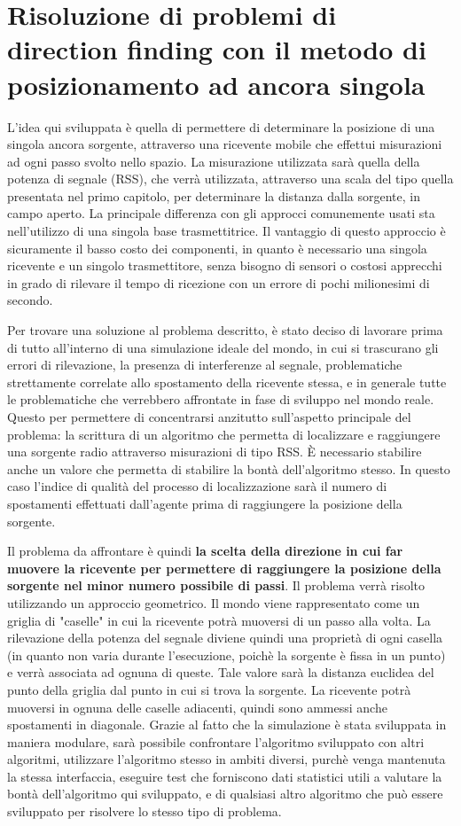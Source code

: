 \section{Risoluzione di problemi di direction finding con il metodo di posizionamento ad ancora singola}
L'idea  qui sviluppata è quella di permettere di determinare la posizione di una singola ancora sorgente, attraverso una ricevente mobile che effettui misurazioni ad ogni passo svolto nello spazio. La misurazione utilizzata sarà quella della potenza di segnale (RSS), che verrà utilizzata, attraverso una scala del tipo quella presentata nel primo capitolo, per determinare la distanza dalla sorgente, in campo aperto.
La principale differenza con gli approcci comunemente usati sta nell'utilizzo di una singola base trasmettitrice. 
Il vantaggio di questo approccio è sicuramente il basso costo dei componenti, in quanto è necessario una singola ricevente e un singolo trasmettitore, senza bisogno di sensori o costosi apprecchi in grado di rilevare il tempo di ricezione con un errore di pochi milionesimi di secondo.

Per trovare una soluzione al problema descritto, è stato deciso di lavorare prima di tutto all'interno di una simulazione ideale del mondo, in cui si trascurano gli errori di rilevazione, la presenza di interferenze al segnale, problematiche strettamente correlate allo spostamento della ricevente stessa, e in generale tutte le problematiche che verrebbero affrontate in fase di sviluppo nel mondo reale. Questo per permettere di concentrarsi anzitutto sull'aspetto principale del problema: la scrittura di un algoritmo che permetta di localizzare e raggiungere una sorgente radio attraverso misurazioni di tipo RSS. È necessario stabilire anche un valore che permetta di stabilire la bontà dell'algoritmo stesso. In questo caso l'indice di qualità del processo di localizzazione sarà il numero di spostamenti effettuati dall'agente prima di raggiungere la posizione della sorgente.

Il problema da affrontare è quindi \textbf{la scelta della direzione in cui far muovere la ricevente per permettere di raggiungere la posizione della sorgente nel minor numero possibile di passi}. Il problema verrà risolto utilizzando un approccio geometrico. Il mondo viene rappresentato come un griglia di "caselle" in cui la ricevente potrà muoversi di un passo alla volta. La rilevazione della potenza del segnale diviene quindi una proprietà di ogni casella (in quanto non varia durante l'esecuzione, poichè la sorgente è fissa in un punto) e verrà associata ad ognuna di queste. Tale valore sarà la distanza euclidea del punto della griglia dal punto in cui si trova la sorgente. La ricevente potrà muoversi in ognuna delle caselle adiacenti, quindi sono ammessi anche spostamenti in diagonale. Grazie al fatto che la simulazione è stata sviluppata in maniera modulare, sarà possibile confrontare l'algoritmo sviluppato con altri algoritmi, utilizzare l'algoritmo stesso in ambiti diversi, purchè venga mantenuta la stessa interfaccia, eseguire test che forniscono dati statistici utili a valutare la bontà dell'algoritmo qui sviluppato, e di qualsiasi altro algoritmo che può essere sviluppato per risolvere lo stesso tipo di problema. 


